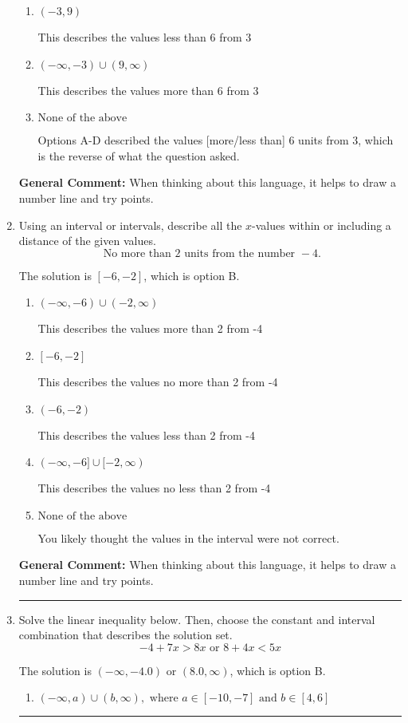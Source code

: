 \documentclass{extbook}[14pt]
\newcommand{\litem}[1]{\item #1

\rule{\textwidth}{0.4pt}}
\begin{document}
\begin{enumerate}
{\begin{enumerate}[label=\Alph*.]
This describes the values no more than 6 from 3
\item \( (-3, 9) \)

This describes the values less than 6 from 3
\item \( (-\infty, -3) \cup (9, \infty) \)

This describes the values more than 6 from 3
\item \( \text{None of the above} \)

Options A-D described the values [more/less than] 6 units from 3, which is the reverse of what the question asked.
\end{enumerate}

\textbf{General Comment:} When thinking about this language, it helps to draw a number line and try points.
}
\litem{
Using an interval or intervals, describe all the $x$-values within or including a distance of the given values.
\[ \text{ No more than } 2 \text{ units from the number } -4. \]

The solution is \( [-6, -2] \), which is option B.\begin{enumerate}[label=\Alph*.]
\item \( (-\infty, -6) \cup (-2, \infty) \)

This describes the values more than 2 from -4
\item \( [-6, -2] \)

This describes the values no more than 2 from -4
\item \( (-6, -2) \)

This describes the values less than 2 from -4
\item \( (-\infty, -6] \cup [-2, \infty) \)

This describes the values no less than 2 from -4
\item \( \text{None of the above} \)

You likely thought the values in the interval were not correct.
\end{enumerate}

\textbf{General Comment:} When thinking about this language, it helps to draw a number line and try points.
}
\litem{
Solve the linear inequality below. Then, choose the constant and interval combination that describes the solution set.
\[ -4 + 7 x > 8 x \text{ or } 8 + 4 x < 5 x \]

The solution is \( (-\infty, -4.0) \text{ or } (8.0, \infty) \), which is option B.\begin{enumerate}[label=\Alph*.]
\item \( (-\infty, a) \cup (b, \infty), \text{ where } a \in [-10, -7] \text{ and } b \in [4, 6] \)


\end{enumerate}}
\end{enumerate}
\end{document}
